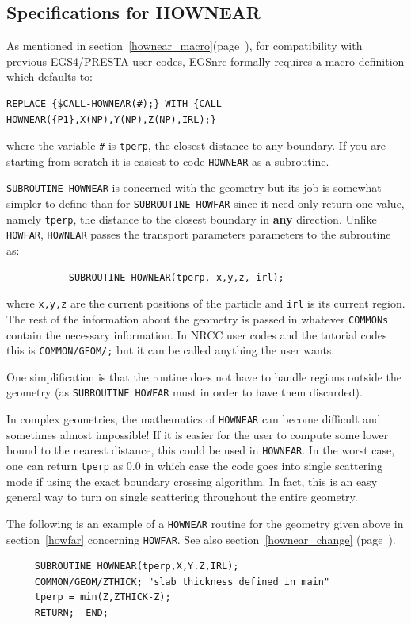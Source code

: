 \subsection{Specifications for HOWNEAR}
\label{hownear}


As mentioned in section~\ref{hownear_macro}(page~\pageref{hownear_macro}),
for compatibility with previous  EGS4/PRESTA user codes,
EGSnrc formally requires a macro definition which defaults to:
\begin{verbatim}
REPLACE {$CALL-HOWNEAR(#);} WITH {CALL HOWNEAR({P1},X(NP),Y(NP),Z(NP),IRL);}
\end{verbatim}
where the variable {\tt \#} is {\tt tperp}, the closest distance to
any boundary.  If you are starting from scratch it is easiest to code
{\tt HOWNEAR} as a subroutine.


{\tt SUBROUTINE HOWNEAR} is concerned with the geometry but its job is
somewhat simpler to define than for {\tt SUBROUTINE HOWFAR} since it need
only return one value, namely {\tt tperp}, the distance to the closest
boundary in {\bfseries any} direction.  Unlike {\tt HOWFAR}, {\tt HOWNEAR} passes the
transport parameters parameters to the subroutine as:
\begin{verbatim}
           SUBROUTINE HOWNEAR(tperp, x,y,z, irl);
\end{verbatim}
where \verb+x,y,z+ are the current positions of the particle and \verb+irl+
is its current region.  The rest of the information about the geometry is
passed in whatever {\tt COMMONs} contain the necessary information. In NRCC
user codes and the tutorial codes this is {\tt COMMON/GEOM/;} but it can be
called anything the user wants.

One simplification is that the routine does not have to handle regions
outside the geometry (as {\tt SUBROUTINE HOWFAR} must in order to have them
discarded).

In complex geometries, the mathematics of {\tt HOWNEAR} can become difficult and
sometimes almost impossible!  If it is easier for the user to compute
some lower bound to the nearest distance, this could be
used in {\tt HOWNEAR}.  In the worst case, one can return \verb+tperp+ as 0.0
in which case the code goes into single scattering mode if using the
exact boundary crossing algorithm.  In fact, this is an easy general way to
turn on single scattering throughout the entire geometry.

The following is an example of a {\tt HOWNEAR} routine for the geometry given
above in section~\ref{howfar} concerning {\tt HOWFAR}.
See also section~\ref{hownear_change} (page~\pageref{hownear_change}).
\begin{verbatim}
     SUBROUTINE HOWNEAR(tperp,X,Y.Z,IRL);
     COMMON/GEOM/ZTHICK; "slab thickness defined in main"
     tperp = min(Z,ZTHICK-Z);
     RETURN;  END;
\end{verbatim}




